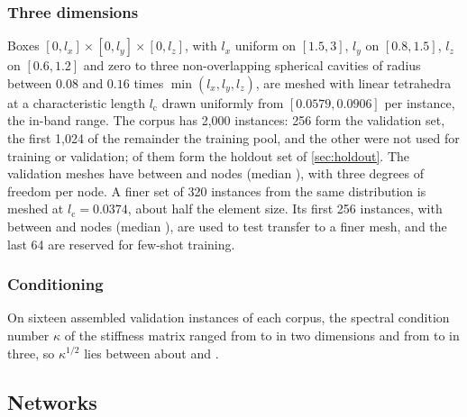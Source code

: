 \subsubsection{Three dimensions}
Boxes $[0,l_x]\times[0,l_y]\times[0,l_z]$, with $l_x$ uniform on $[1.5,3]$, $l_y$ on
$[0.8,1.5]$, $l_z$ on $[0.6,1.2]$ and zero to three non-overlapping spherical cavities of
radius between $0.08$ and $0.16$ times $\min(l_x,l_y,l_z)$, are meshed with linear
tetrahedra at a characteristic length $l_{\mathrm{c}}$ drawn uniformly from $[0.0579,0.0906]$ per
instance, the in-band range. The corpus has 2,000 instances: 256 form the validation set, the first 1,024 of
the remainder the training pool, and the other \numHoldThreeTail{} were not used for
training or validation; \numHoldThreeN{} of them form the holdout set of \cref{sec:holdout}.
The validation meshes have between \numNodesInMin{} and \numNodesInMax{} nodes (median
\numNodesInMedian{}), with three degrees of freedom per node. A finer set of 320 instances
from the same distribution is meshed at $l_{\mathrm{c}}=0.0374$, about half the element size. Its first 256 instances, with between \numNodesFineMin{} and \numNodesFineMax{} nodes (median
\numNodesFineMedian{}), are used to test transfer to a finer mesh, and the last 64 are reserved for
few-shot training.

\subsubsection{Conditioning}
On sixteen assembled validation instances of each corpus, the spectral condition number
$\kappa$ of the stiffness matrix ranged from \numKappaTwoLow{} to \numKappaTwoHigh{} in two
dimensions and from \numKappaThreeLow{} to \numKappaThreeHigh{} in three, so
$\kappa^{1/2}$ lies between about \numSqrtKappaMin{} and \numSqrtKappaMax{}.

\subsection{Networks}\label{sec:methods:networks}

